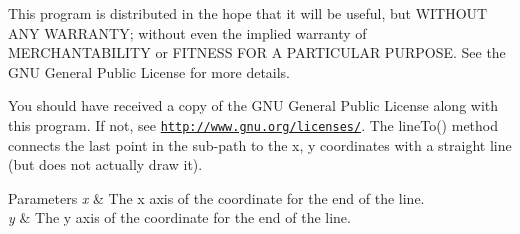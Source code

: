This program is distributed in the hope that it will be useful, but W\+I\+T\+H\+O\+U\+T A\+N\+Y W\+A\+R\+R\+A\+N\+T\+Y; without even the implied warranty of M\+E\+R\+C\+H\+A\+N\+T\+A\+B\+I\+L\+I\+T\+Y or F\+I\+T\+N\+E\+S\+S F\+O\+R A P\+A\+R\+T\+I\+C\+U\+L\+A\+R P\+U\+R\+P\+O\+S\+E. See the G\+N\+U General Public License for more details.

You should have received a copy of the G\+N\+U General Public License along with this program. If not, see \href{http://www.gnu.org/licenses/}{\tt http\+://www.\+gnu.\+org/licenses/}. The line\+To() method connects the last point in the sub-\/path to the x, y coordinates with a straight line (but does not actually draw it). 
\begin{DoxyParams}{Parameters}
{\em x} & The x axis of the coordinate for the end of the line. \\
\hline
{\em y} & The y axis of the coordinate for the end of the line. \\
\hline
\end{DoxyParams}
